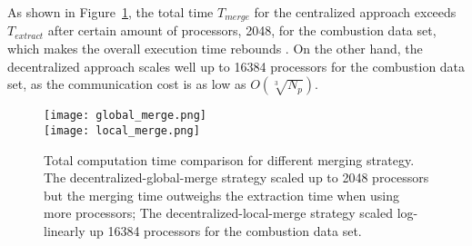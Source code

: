 As shown in Figure~\ref{fig:global-merge}, the total time $T_{merge}$ for the centralized approach exceeds $T_{extract}$ after certain amount of processors, 2048, for the combustion data set, which makes the overall execution time rebounds . On the other hand, the decentralized approach  scales well up to 16384 processors for the combustion data set, as the communication cost is as low as ${O(\sqrt[3]{N_p})}$.

\begin{figure}[t]
\centering
\texttt{[image: global\_merge.png]}\\
\texttt{[image: local\_merge.png]}
\caption{Total computation time comparison for different merging strategy. The decentralized-global-merge strategy scaled up to 2048 processors but the merging time outweighs the extraction time when using more processors; The decentralized-local-merge strategy scaled log-linearly up 16384 processors for the combustion data set.}
\label{fig:global-merge}
\end{figure}


